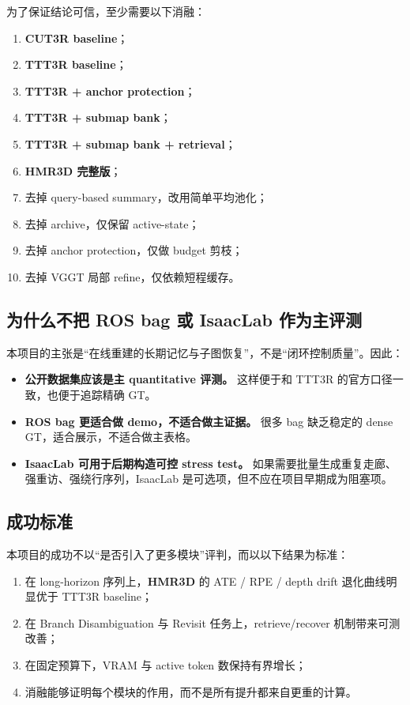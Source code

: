 \documentclass[12pt]{article}
\newcommand{\method}{\textbf{HMR3D}}
\begin{document}
为了保证结论可信，至少需要以下消融：
\begin{enumerate}
  \item \textbf{CUT3R baseline}；
  \item \textbf{TTT3R baseline}；
  \item \textbf{TTT3R + anchor protection}；
  \item \textbf{TTT3R + submap bank}；
  \item \textbf{TTT3R + submap bank + retrieval}；
  \item \textbf{\method{} 完整版}；
  \item 去掉 query-based summary，改用简单平均池化；
  \item 去掉 archive，仅保留 active-state；
  \item 去掉 anchor protection，仅做 budget 剪枝；
  \item 去掉 VGGT 局部 refine，仅依赖短程缓存。
\end{enumerate}

\subsection{为什么不把 ROS bag 或 IsaacLab 作为主评测}

本项目的主张是“在线重建的长期记忆与子图恢复”，不是“闭环控制质量”。因此：
\begin{itemize}
  \item \textbf{公开数据集应该是主 quantitative 评测。} 这样便于和 TTT3R 的官方口径一致，也便于追踪精确 GT。
  \item \textbf{ROS bag 更适合做 demo，不适合做主证据。} 很多 bag 缺乏稳定的 dense GT，适合展示，不适合做主表格。
  \item \textbf{IsaacLab 可用于后期构造可控 stress test。} 如果需要批量生成重复走廊、强重访、强绕行序列，IsaacLab 是可选项，但不应在项目早期成为阻塞项。
\end{itemize}

\subsection{成功标准}

本项目的成功不以“是否引入了更多模块”评判，而以以下结果为标准：
\begin{enumerate}
  \item 在 long-horizon 序列上，\method{} 的 ATE / RPE / depth drift 退化曲线明显优于 TTT3R baseline；
  \item 在 Branch Disambiguation 与 Revisit 任务上，retrieve/recover 机制带来可测改善；
  \item 在固定预算下，VRAM 与 active token 数保持有界增长；
  \item 消融能够证明每个模块的作用，而不是所有提升都来自更重的计算。
\end{enumerate}
\end{document}
